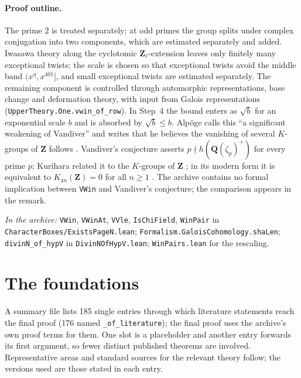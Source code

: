 \documentclass[11pt]{article}
\newcommand{\Lean}[1]{\texttt{\small #1}}
\newcommand{\inarch}[1]{\par{\small\raggedright\noindent\emph{In the archive:} #1\par}}
\newcommand{\Q}{\mathbf{Q}}
\newcommand{\Z}{\mathbf{Z}}
\begin{document}
\paragraph{Proof outline.} The prime $2$ is treated separately; at odd primes the group splits under complex conjugation into two components, which are estimated separately and added. Iwasawa theory along the cyclotomic $\Z_\ell$-extension leaves only finitely many exceptional twists; the scale is chosen so that exceptional twists avoid the middle band $(x^\eta,x^{401}]$, and small exceptional twists are estimated separately. The remaining component is controlled through automorphic representations, base change and deformation theory, with input from Galois representations (\Lean{UpperTheory.One.vwin\_of\_row}). In Step~4 the bound enters as $\sqrt b$ for an exponential scale $b$ and is absorbed by $\sqrt b\le b$. Alp\"oge calls this ``a significant weakening of Vandiver'' and writes that he believes the vanishing of several $K$-groups of $\Z$ follows \cite{alpoge}. Vandiver's conjecture asserts $p\nmid h(\Q(\zeta_p)^+)$ for every prime $p$; Kurihara related it to the $K$-groups of $\Z$ \cite{kurihara}; in its modern form it is equivalent to $K_{4n}(\Z)=0$ for all $n\ge1$ \cite{weibel}. The archive contains no formal implication between \Lean{VWin} and Vandiver's conjecture; the comparison appears in the remark.

\inarch{\Lean{VWin}, \Lean{VWinAt}, \Lean{VVle}, \Lean{IsChiField}, \Lean{WinPair} in \Lean{CharacterBoxes/ExistsPageN.lean}; \Lean{Formalism.GaloisCohomology.shaLen}; \Lean{divinN\_of\_hypV} in \Lean{DivinNOfHypV.lean}; \Lean{WinPairs.lean} for the rescaling.}

\section{The foundations}\label{sec:found}
A summary file lists 185 single entries through which literature statements reach the final proof (176 named \Lean{\_of\_literature}); the final proof uses the archive's own proof terms for them. One slot is a placeholder and another entry forwards its first argument, so fewer distinct published theorems are involved. Representative areas and standard sources for the relevant theory follow; the versions used are those stated in each entry.
\end{document}
